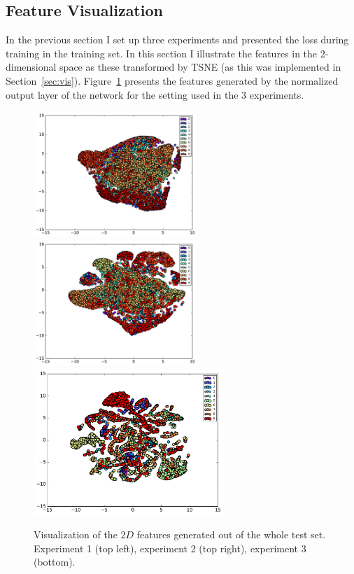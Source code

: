 \documentclass{article}
\begin{document}
\subsection{Feature Visualization}

In the previous section I set up three experiments and presented the loss during training in the training set.
In this section I illustrate the features in the 2-dimensional space as these transformed by TSNE (as this was implemented in Section~\ref{sec:vis}).
Figure~\ref{fig:features} presents the features generated by the normalized output layer of the network for the setting used in the 3 experiments. 


\begin{figure}[h!]
\centering
\includegraphics[width=6.2cm]{visualization-siamese-plain.pdf}
\includegraphics[width=6.2cm]{visualization-siamese-1.pdf}
\includegraphics[width=7.2cm]{visualization-siamese-3.pdf}
\caption{Visualization of the $2D$ features generated out of the whole test set. Experiment 1 (top left), experiment 2 (top right), experiment 3 (bottom).}
\label{fig:features}
\end{figure}
\end{document}
